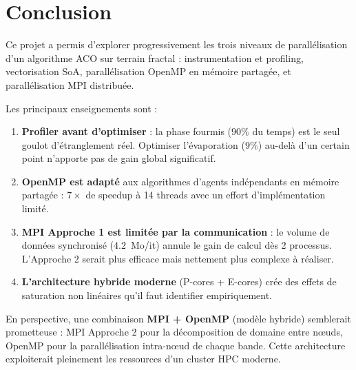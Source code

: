 \section{Conclusion}

Ce projet a permis d'explorer progressivement les trois niveaux de parallélisation
d'un algorithme ACO sur terrain fractal : instrumentation et profiling, vectorisation
SoA, parallélisation OpenMP en mémoire partagée, et parallélisation MPI distribuée.

Les principaux enseignements sont :

\begin{enumerate}
    \item \textbf{Profiler avant d'optimiser} : la phase fourmis ($90\%$ du temps) est
          le seul goulot d'étranglement réel. Optimiser l'évaporation ($9\%$) au-delà
          d'un certain point n'apporte pas de gain global significatif.
    \item \textbf{OpenMP est adapté} aux algorithmes d'agents indépendants en mémoire
          partagée : $7\times$ de speedup à 14 threads avec un effort d'implémentation
          limité.
    \item \textbf{MPI Approche 1 est limitée par la communication} : le volume de
          données synchronisé ($4.2$~Mo/it) annule le gain de calcul dès 2 processus.
          L'Approche 2 serait plus efficace mais nettement plus complexe à réaliser.
    \item \textbf{L'architecture hybride moderne} (P-cores + E-cores) crée des
          effets de saturation non linéaires qu'il faut identifier empiriquement.
\end{enumerate}

En perspective, une combinaison \textbf{MPI + OpenMP} (modèle hybride) semblerait
prometteuse : MPI Approche 2 pour la décomposition de domaine entre nœuds, OpenMP
pour la parallélisation intra-nœud de chaque bande. Cette architecture exploiterait
pleinement les ressources d'un cluster HPC moderne.

